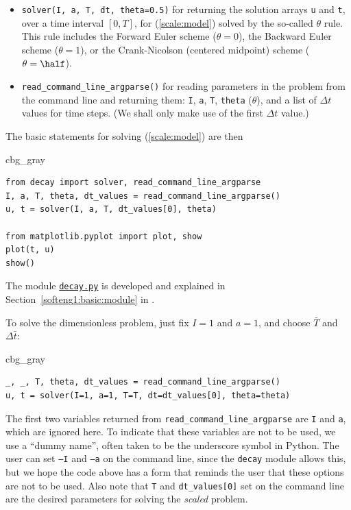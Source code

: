 \documentclass[graybox,envcountchap,sectrefs,final]{svmonodo}
\newenvironment{_cod_tight}[1]{
   \def\FrameCommand{\colorbox{#1}}
   \FrameRule0.6pt\MakeFramed {\FrameRestore}\vskip3mm}
   {\vskip0mm\endMakeFramed}
\newenvironment{cod}[1]{
\bgroup\rmfamily
\fboxsep=0mm\relax
\begin{_cod_tight}{#1}
\list{}{\parsep=-2mm\parskip=0mm\topsep=0pt\leftmargin=2mm
\rightmargin=2\leftmargin\leftmargin=4pt\relax}
\item\relax}
{\endlist\end{_cod_tight}\egroup}
\begin{document}
\begin{itemize}
  \item \texttt{solver(I, a, T, dt, theta=0.5)} for returning the solution arrays
    \texttt{u} and \texttt{t}, over a time interval $[0,T]$,
    for (\ref{scale:model}) solved by the so-called
    $\theta$ rule. This rule includes the Forward Euler scheme ($\theta=0$),
    the Backward Euler scheme ($\theta=1$), or the Crank-Nicolson
    (centered midpoint) scheme ($\theta=\half$).

  \item \Verb!read_command_line_argparse()! for reading parameters in the problem
    from the command line and returning them: \texttt{I}, \texttt{a}, \texttt{T}, \texttt{theta} ($\theta$),
    and a list of $\Delta t$ values for time steps. (We shall only make
    use of the first $\Delta t$ value.)
\end{itemize}

\noindent
The basic statements for solving (\ref{scale:model}) are
then

\begin{cod}{cbg_gray}\begin{Verbatim}[numbers=none,fontsize=\fontsize{9pt}{9pt},baselinestretch=0.95,xleftmargin=2mm]
from decay import solver, read_command_line_argparse
I, a, T, theta, dt_values = read_command_line_argparse()
u, t = solver(I, a, T, dt_values[0], theta)

from matplotlib.pyplot import plot, show
plot(t, u)
show()
\end{Verbatim}
\end{cod}
\noindent
The module \href{{http://tinyurl.com/o8pb3yy/decay.py}}{\nolinkurl{decay.py}} is developed
and explained in
Section~\ref{softeng1:basic:module} in \cite{Langtangen_decay}.

To solve the dimensionless problem, just fix $I=1$ and $a=1$,
and choose $\bar T$ and $\Delta\bar t$:

\begin{cod}{cbg_gray}\begin{Verbatim}[numbers=none,fontsize=\fontsize{9pt}{9pt},baselinestretch=0.95,xleftmargin=2mm]
_, _, T, theta, dt_values = read_command_line_argparse()
u, t = solver(I=1, a=1, T=T, dt=dt_values[0], theta=theta)
\end{Verbatim}
\end{cod}
\noindent
The first two variables returned from \Verb!read_command_line_argparse!
are \texttt{I} and \texttt{a}, which are ignored here. To indicate that these
variables are not to be used, we use a
``dummy name'', often taken to be the underscore symbol in
Python. The user can set \texttt{--I} and \texttt{--a} on the command line, since
the \texttt{decay} module allows this, but we hope the code above has a form
that reminds the user that these options are not to be used.
Also note that \texttt{T} and \Verb!dt_values[0]! set on the command line are
the desired parameters for solving the \emph{scaled} problem.
\end{document}
